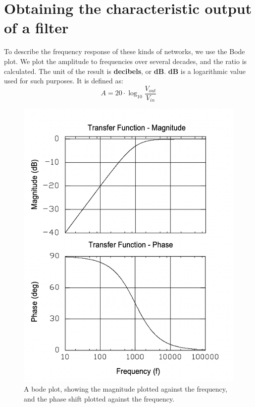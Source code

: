 \section{Obtaining the characteristic output of a filter}


To describe the frequency response of these kinds of networks, we use the Bode plot. We plot the amplitude to frequencies over several decades, and the ratio is calculated.
The unit of the result is \textbf{decibels}, or \textbf{dB}. \textbf{dB} is a logarithmic value used for such purposes. It is defined as:
\begin{equation}
    A = 20 \cdot \log_{10}\frac{V_{out}}{V_{in}}
\end{equation}

\begin{figure}[H]
    \centering
    \includegraphics[scale=0.5]{images/bode_plots.png}
    \caption{A bode plot, showing the magnitude plotted against the frequency, and the phase shift plotted against the frequency.}
\end{figure}

